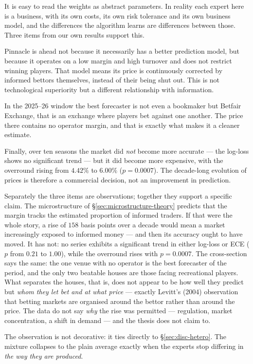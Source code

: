 \documentclass[12pt,a4paper,oneside]{report}
\renewcommand{\_}{\oldunderscore\allowbreak}
\theoremstyle{definition}
\theoremstyle{plain}
\theoremstyle{remark}
\begin{document}
It is easy to read the weights as abstract parameters. In reality each expert here is a business,
with its own costs, its own risk tolerance and its own business model, and the differences the
algorithm learns are differences between those. Three items from our own results support this.

Pinnacle is ahead not because it necessarily has a better prediction model, but because it
operates on a low margin and high turnover and does not restrict winning players. That model
means its price is continuously corrected by informed bettors themselves, instead of their being
shut out. This is not technological superiority but a different relationship with information.

In the 2025--26 window the best forecaster is not even a bookmaker but Betfair Exchange, that is
an exchange where players bet against one another. The price there contains no operator margin,
and that is exactly what makes it a cleaner estimate.

Finally, over ten seasons the market did \emph{not} become more accurate --- the log-loss shows no
significant trend --- but it did become more expensive, with the overround rising from $4.42\%$ to
$6.00\%$ ($p=0.0007$). The decade-long evolution of prices is therefore a commercial decision, not
an improvement in prediction.

Separately the three items are observations; together they support a specific claim. The
microstructure of \S\ref{sec:microstructure-theory} predicts that the margin tracks the estimated
proportion of informed traders. If that were the whole story, a rise of $158$ basis points over a
decade would mean a market increasingly exposed to informed money --- and then its accuracy ought
to have moved. It has not: no series exhibits a significant trend in either log-loss or ECE ($p$
from $0.21$ to $1.00$), while the overround rises with $p=0.0007$. The cross-section says the
same: the one venue with no operator is the best forecaster of the period, and the only two
beatable houses are those facing recreational players. What separates the houses, that is, does
not appear to be how well they predict but \emph{whom they let bet and at what price} --- exactly
Levitt's (2004) observation that betting markets are organised around the bettor rather than
around the price. The data do not say \emph{why} the rise was permitted --- regulation, market
concentration, a shift in demand --- and the thesis does not claim to.

The observation is not decorative: it ties directly to \S\ref{sec:disc-hetero}. The mixture
collapses to the plain average exactly when the experts stop differing in \emph{the way they are
produced}.
\end{document}
